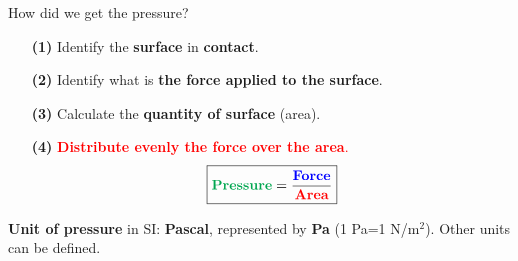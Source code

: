 \documentclass[usenames,dvipsnames]{beamer}
\begin{document}
\begin{frame}{\huge{How did we get the pressure?}}


\begin{itemize}
    \item[\Large \bf (1)] \Large{Identify the \textbf{surface} in \textbf{contact}.}
    \item[\bf (2)] Identify what is \textbf{the force applied to the surface}.
    \item[\bf (3)] Calculate the \textbf{quantity of surface} (area).
    \item[\bf (4)] \textcolor{red}{\textbf{Distribute evenly the force over the area}.}
    \begin{equation*}
    \boxed{\text{\textcolor{Green}{\bf Pressure}}=\frac{\text{\textcolor{blue}{\bf Force}}}{\text{\textcolor{red}{\bf Area}}}}
\end{equation*}
\end{itemize}
\Large{\textbf{Unit of pressure} in SI: \textbf{Pascal}, represented by \textbf{Pa} (1 Pa=1 N/m$^2$). Other units can be defined.\\

}
\end{frame}
\end{document}
